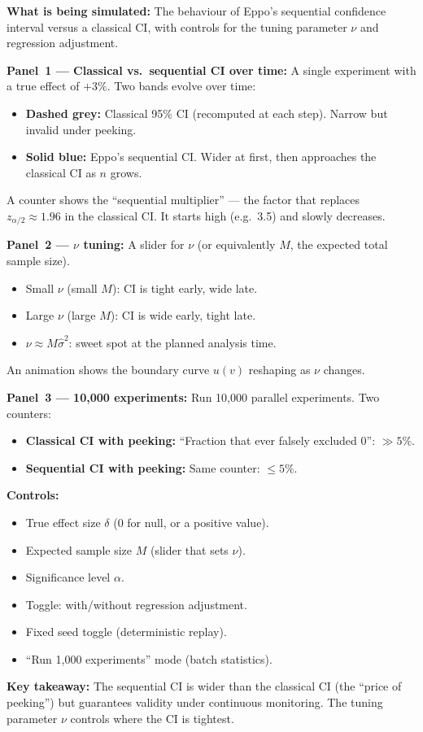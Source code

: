 \documentclass[12pt, a4paper]{article}
\begin{document}
\begin{simulation}
\textbf{What is being simulated:}
The behaviour of Eppo's sequential confidence interval versus a classical CI,
with controls for the tuning parameter $\nu$ and regression adjustment.

\textbf{Panel~1 --- Classical vs.\ sequential CI over time:}
A single experiment with a true effect of $+3\%$.  Two bands evolve over time:
\begin{itemize}[nosep]
  \item \textbf{Dashed grey:} Classical 95\% CI (recomputed at each step).
        Narrow but invalid under peeking.
  \item \textbf{Solid blue:} Eppo's sequential CI.  Wider at first, then
        approaches the classical CI as $n$ grows.
\end{itemize}

A counter shows the ``sequential multiplier'' --- the factor that replaces
$z_{\alpha/2} \approx 1.96$ in the classical CI.  It starts high (e.g.\ 3.5)
and slowly decreases.

\textbf{Panel~2 --- $\nu$ tuning:}
A slider for $\nu$ (or equivalently $M$, the expected total sample size).
\begin{itemize}[nosep]
  \item Small $\nu$ (small $M$): CI is tight early, wide late.
  \item Large $\nu$ (large $M$): CI is wide early, tight late.
  \item $\nu \approx M\hat{\sigma}^2$: sweet spot at the planned analysis
        time.
\end{itemize}

An animation shows the boundary curve $u(v)$ reshaping as $\nu$ changes.

\textbf{Panel~3 --- 10,000 experiments:}
Run 10,000 parallel experiments.  Two counters:
\begin{itemize}[nosep]
  \item \textbf{Classical CI with peeking:} ``Fraction that ever falsely
        excluded 0'': $\gg 5\%$.
  \item \textbf{Sequential CI with peeking:} Same counter: $\leq 5\%$.
\end{itemize}

\textbf{Controls:}
\begin{itemize}[nosep]
  \item True effect size $\delta$ (0 for null, or a positive value).
  \item Expected sample size $M$ (slider that sets $\nu$).
  \item Significance level $\alpha$.
  \item Toggle: with/without regression adjustment.
  \item Fixed seed toggle (deterministic replay).
  \item ``Run 1,000 experiments'' mode (batch statistics).
\end{itemize}

\textbf{Key takeaway:}
The sequential CI is wider than the classical CI (the ``price of peeking'')
but guarantees validity under continuous monitoring.  The tuning parameter
$\nu$ controls where the CI is tightest.
\end{simulation}
\end{document}
